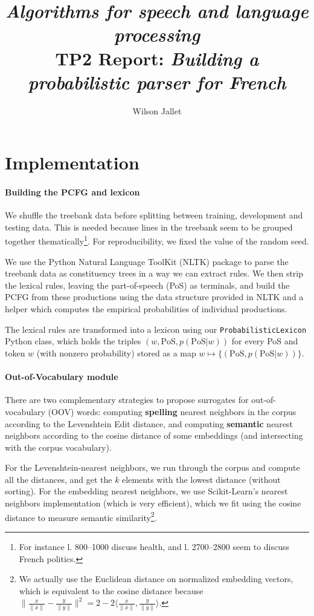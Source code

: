 \documentclass[11pt]{article}
\title{\textit{Algorithms for speech and language processing}\\
{\sffamily TP2 Report: \textit{Building a probabilistic parser for French}}}
\author{Wilson Jallet}
\begin{document}
\maketitle

\section{Implementation}

\paragraph{Building the PCFG and lexicon}

We shuffle the treebank data before splitting between training, development and testing data. This is needed because lines in the treebank seem to be grouped together thematically\footnote{For instance l. 800--1000 discuss health, and l. 2700--2800 seem to discuss French politics.}. For reproducibility, we fixed the value of the random seed.

We use the Python Natural Language ToolKit (NLTK) \cite{nltkCitation} package to parse the treebank data as constituency trees in a way we can extract rules.
We then strip the lexical rules, leaving the part-of-speech (PoS) as terminals, and build the PCFG from these productions using the data structure provided in NLTK and a helper which computes the empirical probabilities of individual productions.

The lexical rules are transformed into a lexicon using our \lstinline|ProbabilisticLexicon| Python class, which holds the triples $(w,\mathrm{PoS}, p(\mathrm{PoS}|w))$ for every PoS and token $w$ (with nonzero probability) stored as a map $w \mapsto \{(\mathrm{PoS},p(\mathrm{PoS}|w))\}$.



\paragraph{Out-of-Vocabulary module}

There are two complementary strategies to propose surrogates for out-of-vocabulary (OOV) words: computing \textbf{spelling} nearest neighbors in the corpus according to the Levenshtein Edit distance, and computing \textbf{semantic} nearest neighbors according to the cosine distance of some embeddings (and intersecting with the corpus vocabulary).

For the Levenshtein-nearest neighbors, we run through the corpus and compute all the distances, and get the $k$ elements with the lowest distance (without sorting).
For the embedding nearest neighbors, we use Scikit-Learn's nearest neighbors implementation \cite{scikit-learn} (which is very efficient), which we fit using the cosine distance to measure semantic similarity\footnote{We actually use the Euclidean distance on normalized embedding vectors, which is equivalent to the cosine distance because $\|\frac{x}{\|x\|} - \frac{y}{\|y\|}\|^2 = 2 - 2\langle \frac{x}{\|x\|}, \frac{y}{\|y\|}\rangle$.}.
\end{document}
